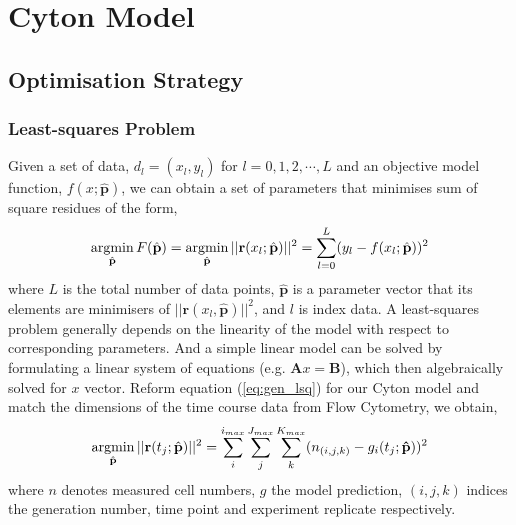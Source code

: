 \documentclass{article}
\newcommand{\enterProblemHeader}[1]{
    }
\newcommand{\exitProblemHeader}[1]{
    }
\newcounter{homeworkProblemCounter} %
\newcommand{\homeworkProblemName}{}
\newenvironment{homeworkProblem}[1][Problem \arabic{homeworkProblemCounter}]{ %
    \stepcounter{homeworkProblemCounter} %
    \renewcommand{\homeworkProblemName}{#1} %
    \section{\homeworkProblemName} %
    \enterProblemHeader{\homeworkProblemName} %
    }{
    \exitProblemHeader{\homeworkProblemName} %
    }
\begin{document}
\begin{homeworkProblem}[Cyton Model]
        \subsection{Optimisation Strategy}
            \subsubsection{Least-squares Problem}
            Given a set of data, $d_l = (x_l, y_l)$ for $l = 0, 1, 2, \cdots, L$ and an objective model function, $f(x;\mathbf{\hat{p}})$, we can obtain a set of parameters that minimises sum of square residues of the form,
            \begin{equation} \label{eq:gen_lsq}
                \operatornamewithlimits{argmin}\limits_{\hat{\mathbf{p}}} F(\hat{\mathbf{p}}) = \operatornamewithlimits{argmin}\limits_{\hat{\mathbf{p}}} ||\mathbf{r}(x_l;\hat{\mathbf{p}})||^2 = \sum_{l=0}^{L} (y_l - f(x_l;\hat{\mathbf{p}}))^2
            \end{equation} 
            where $L$ is the total number of data points, $\mathbf{\hat{p}}$ is a parameter vector that its elements are minimisers of $||\mathbf{r}(x_l, \mathbf{\hat{p}})||^2$, and $l$ is index data. A least-squares problem generally depends on the linearity of the model with respect to corresponding parameters. And a simple linear model can be solved by formulating a linear system of equations (e.g. $\mathbf{A}x = \mathbf{B}$), which then algebraically solved for $x$ vector. Reform equation (\ref{eq:gen_lsq}) for our Cyton model and match the dimensions of the time course data from Flow Cytometry, we obtain,
            \begin{equation}
                \operatornamewithlimits{argmin}\limits_{\hat{\mathbf{p}}} ||\mathbf{r}(t_j;\hat{\mathbf{p}})||^2 = \sum_i^{i_{max}} \sum_j^{J_{max}} \sum_k^{K_{max}}(n_{(i,j,k)} - g_i(t_j;\mathbf{\hat{p}}))^2
            \end{equation}
            where $n$ denotes measured cell numbers, $g$ the model prediction, $(i, j, k)$ indices the generation number, time point and experiment replicate respectively.


\end{homeworkProblem}
\end{document}
